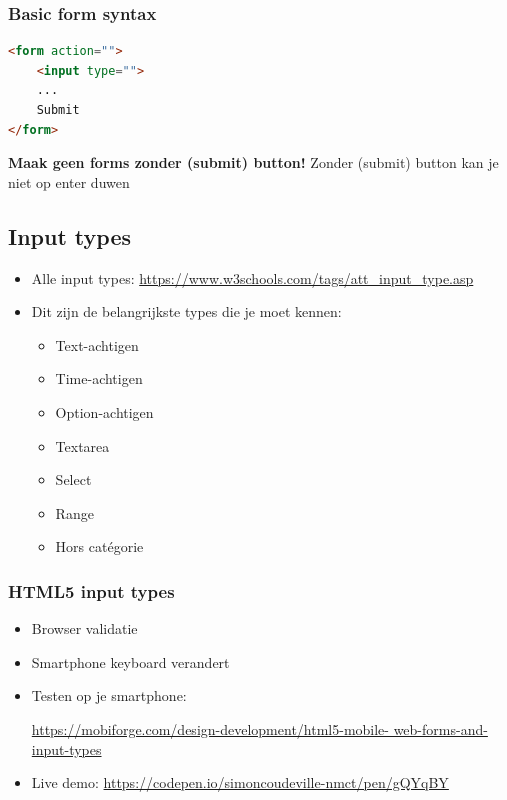 \documentclass{article}
\newcommand{\bold}[1]{\textbf{#1}}
\begin{document}
\subsubsection{Basic form syntax}

\begin{lstlisting}[language=HTML]
<form action="">
    <input type="">
    ...
    Submit
</form>
\end{lstlisting}

\bold{Maak geen forms zonder (submit) button!} Zonder (submit) button kan je niet op enter duwen

\subsection{Input types}

\begin{itemize}
    \item Alle input types: \url{https://www.w3schools.com/tags/att_input_type.asp}
    \item Dit zijn de belangrijkste types die je moet kennen:
    \begin{itemize}
        \item Text-achtigen
        \item Time-achtigen
        \item Option-achtigen
        \item Textarea
        \item Select
        \item Range
        \item Hors catégorie
    \end{itemize} 
\end{itemize}

\subsubsection{HTML5 input types}

\begin{itemize}
    \item Browser validatie
    \item Smartphone keyboard verandert
    \item Testen op je smartphone: 
    
    \url{https://mobiforge.com/design-development/html5-mobile-
    web-forms-and-input-types}
    \item Live demo: \url{https://codepen.io/simoncoudeville-nmct/pen/gQYqBY}
\end{itemize}
\end{document}
